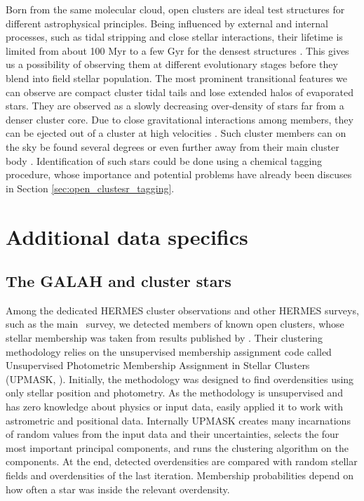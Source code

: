 Born from the same molecular cloud, open clusters are ideal test structures for different astrophysical principles. Being influenced by external and internal processes, such as tidal stripping and close stellar interactions, their lifetime is limited from about 100 Myr to a few Gyr for the densest structures \cite{1998A&A...337..363P, 2013MNRAS.434.2509M}. This gives us a possibility of observing them at different evolutionary stages \cite{2006BASI...34..153C, 2007A&A...468..139P} before they blend \cite{2001A&A...366..827B} into field stellar population. The most prominent transitional features we can observe are compact cluster tidal tails \cite{2019AA...627A...4R, 2019AJ....157..115Y, 2019AA...621L...3M, 2019arXiv191206657Z} and lose extended halos of evaporated stars. They are observed as a slowly decreasing over-density \cite{2002A&A...385..471C, 2004A&A...427..485B, 2019AA...627A.119C} of stars far from a denser cluster core. Due to close gravitational interactions among members, they can be ejected out of a cluster at high velocities \cite{2009MNRAS.396..570G, 2010MNRAS.402..105G, 2017MNRAS.470.3049R}. Such cluster members can on the sky be found several degrees or even further away from their main cluster body \cite{2007MNRAS.376L..29G, 2018MNRAS.473.4612K, 2019ApJ...884....6M}. Identification of such stars could be done using a chemical tagging procedure, whose importance and potential problems have already been discuses in Section \ref{sec:open_clustesr_tagging}. 

\section{Additional data specifics}
\label{sec:data_clusters}

\subsection{The GALAH and cluster stars}
\label{sec:galah_clusters}
Among the dedicated HERMES cluster observations and other HERMES surveys, such as the main \Gh\ survey, we detected members of known open clusters, whose stellar membership was taken from results published by \citet{2018A&A...618A..93C}. Their clustering methodology relies on the unsupervised membership assignment code called Unsupervised Photometric Membership Assignment in Stellar Clusters (UPMASK, \cite{2014A&A...561A..57K}). Initially, the methodology was designed to find overdensities using only stellar position and photometry. As the methodology is unsupervised and has zero knowledge about physics or input data, \citet{2014A&A...561A..57K} easily applied it to work with astrometric and positional data. Internally UPMASK creates many incarnations of random values from the input data and their uncertainties, selects the four most important principal components, and runs the clustering algorithm on the components. At the end, detected overdensities are compared with random stellar fields and overdensities of the last iteration. Membership probabilities depend on how often a star was inside the relevant overdensity.

